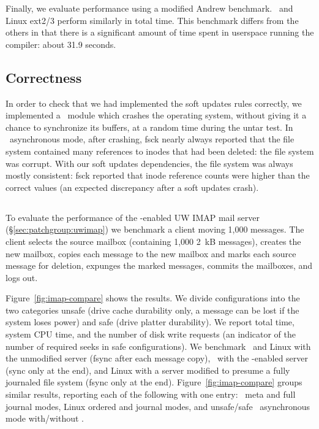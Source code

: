 Finally, we evaluate performance using a modified Andrew benchmark.
\Kudos\ and Linux ext2/3 perform similarly in total time. This benchmark
differs from the others in that there is a significant amount of time spent
in userspace running the compiler: about 31.9 seconds.

\subsection {Correctness}
\label{sec:eval:correctness}

In order to check that we had implemented the soft updates rules correctly, we
implemented a \Kudos\ module which crashes the operating system, without
giving it a chance to synchronize its buffers, at a random time during the
untar test.
%
In \Kudos\ asynchronous mode, after crashing, fsck nearly always reported that
the file system contained many references to inodes that had been deleted: the
file system was corrupt.
%
With our soft updates dependencies, the file system was always mostly
consistent: fsck reported that inode reference counts were higher than the
correct values (an expected discrepancy after a soft updates crash).

\subsection {\Patchgroups}
\label{sec:evaluation:uwimap}


To evaluate the performance of the \patchgroup-enabled UW IMAP mail
server (\S\ref{sec:patchgroup:uwimap}) we benchmark a client moving
1,000 messages. The client selects the source mailbox (containing
1,000 2~kB messages), creates the new mailbox, copies each message to
the new mailbox and marks each source message for deletion, expunges
the marked messages, commits the mailboxes, and logs out.

Figure~\ref{fig:imap-compare} shows the results.
%
We divide configurations into the two categories unsafe (drive cache
durability only, a message can be lost if the system loses power) and safe
(drive platter durability).
%
We report total time, system CPU time, and the number of disk write
requests (an indicator of the number of required seeks in safe
configurations).
%
We benchmark
%
\Kudos\ and Linux with the unmodified server (fsync after each message
copy),
%
\Kudos\ with the \patchgroup-enabled server (sync only at the end),
%
and Linux with a server modified to presume a fully journaled file
system (fsync only at the end).
%
Figure~\ref{fig:imap-compare} groups similar results, reporting each
of the following with one entry:
%
\Kudos\ meta and full journal modes,
%
Linux ordered and journal modes,
%
and unsafe/safe \Kudos\ asynchronous mode with/without \patchgroups.

